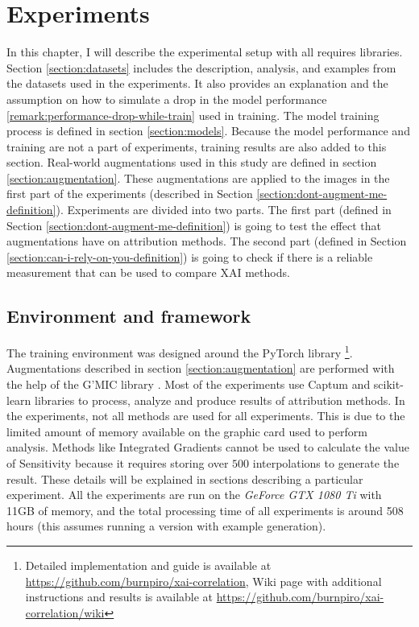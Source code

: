 \chapter{Experiments}\label{chapter:experiments}
\thispagestyle{chapterBeginStyle}

In this chapter, I will describe the experimental setup with all requires libraries. Section \ref{section:datasets} includes the description, analysis, and examples from the datasets used in the experiments. It also provides an explanation and the assumption on how to simulate a drop in the model performance \ref{remark:performance-drop-while-train} used in training. The model training process is defined in section \ref{section:models}. Because the model performance and training are not a part of experiments, training results are also added to this section. Real-world augmentations used in this study are defined in section \ref{section:augmentation}. These augmentations are applied to the images in the first part of the experiments (described in Section \ref{section:dont-augment-me-definition}). Experiments are divided into two parts. The first part (defined in Section \ref{section:dont-augment-me-definition}) is going to test the effect that augmentations have on attribution methods. The second part (defined in Section \ref{section:can-i-rely-on-you-definition}) is going to check if there is a reliable measurement that can be used to compare XAI methods.

\section*{Environment and framework}

The training environment was designed around the PyTorch library \cite{NEURIPS2019_9015}\footnote{Detailed implementation and guide is available at \url{https://github.com/burnpiro/xai-correlation}, Wiki page with additional instructions and results is available at \url{https://github.com/burnpiro/xai-correlation/wiki}}. Augmentations described in section \ref{section:augmentation} are performed with the help of the G'MIC library \cite{gmic}. Most of the experiments use Captum \cite{kokhlikyan2020captum} and scikit-learn \cite{scikit-learn} libraries to process, analyze and produce results of attribution methods. In the experiments, not all methods are used for all experiments. This is due to the limited amount of memory available on the graphic card used to perform analysis. Methods like Integrated Gradients \cite{sundararajan2017axiomatic} cannot be used to calculate the value of Sensitivity \cite{yeh2019fidelity} because it requires storing over $500$ interpolations to generate the result. These details will be explained in sections describing a particular experiment. All the experiments are run on the \textit{GeForce GTX 1080 Ti} with 11GB of memory, and the total processing time of all experiments is around 508 hours (this assumes running a version with example generation).




